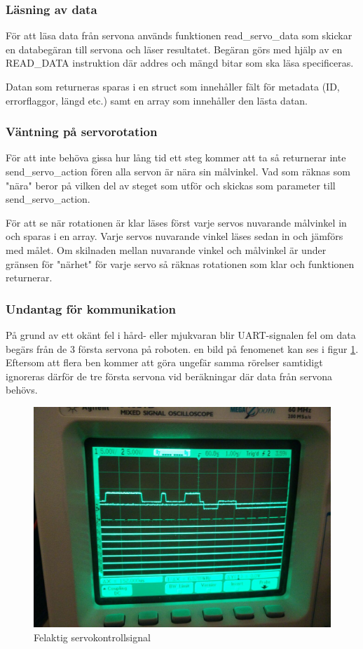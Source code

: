 \documentclass[a4paper,titlepage,12pt]{article}
\begin{document}
	\subsubsection{Läsning av data}
	För att läsa data från servona används funktionen read\_servo\_data som skickar en 
	databegäran till servona och läser resultatet. Begäran görs med hjälp av en
	READ\_DATA instruktion där addres och mängd bitar som ska läsa specificeras.
	
	Datan som returneras sparas i en struct som innehåller fält för metadata 
	(ID, errorflaggor, längd etc.) samt en array som innehåller den lästa datan.
	
	\subsubsection{Väntning på servorotation}
	För att inte behöva gissa hur lång tid ett steg kommer att ta så returnerar inte
	send\_servo\_action fören alla servon är nära sin målvinkel. Vad som räknas som "nära"
	beror på vilken del av steget som utför och skickas som parameter till 
	send\_servo\_action.

	För att se när rotationen är klar läses först varje servos nuvarande målvinkel in och
	sparas i en array. Varje servos nuvarande vinkel läses sedan in och jämförs med målet.
	Om skilnaden mellan nuvarande vinkel och målvinkel är under gränsen för "närhet" för
	varje servo så räknas rotationen som klar och funktionen returnerar.

	\subsubsection{Undantag för kommunikation}
	På grund av ett okänt fel i hård- eller mjukvaran blir UART-signalen fel om data 
	begärs från de 3 första servona på roboten. en bild på fenomenet kan ses i figur 
	\ref{fig:servo_tri_state_bug}. Eftersom att flera ben kommer att göra ungefär samma 
	rörelser samtidigt ignoreras därför de tre första servona vid beräkningar där data
	från servona behövs.

	\begin{figure}[htpb]
		\centering
		\includegraphics[width=0.8\linewidth]{images/uart_tri_state.jpg}
		\caption{Felaktig servokontrollsignal}
		\label{fig:servo_tri_state_bug}
	\end{figure}
\end{document}
